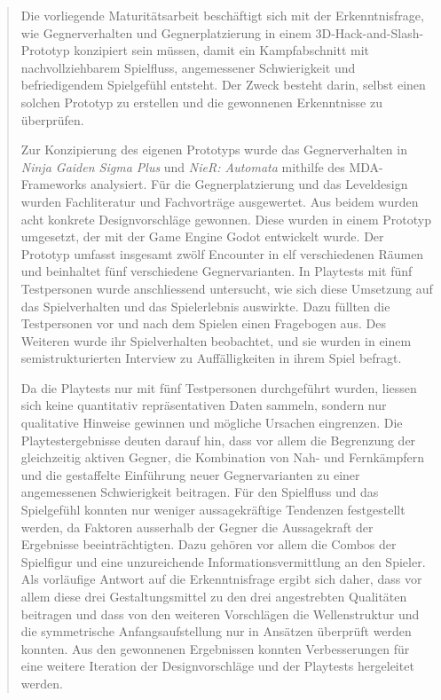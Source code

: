 \documentclass[10pt]{article}
\newcommand{\game}[1]{\textit{#1}}   %
\begin{document}
\begin{abstract}
    Die vorliegende Maturitätsarbeit beschäftigt sich mit der Erkenntnisfrage, wie Gegnerverhalten und Gegnerplatzierung in einem 3D-Hack-and-Slash-Prototyp konzipiert sein müssen, damit ein Kampfabschnitt mit nachvollziehbarem Spielfluss, angemessener Schwierigkeit und befriedigendem Spielgefühl entsteht. Der Zweck besteht darin, selbst einen solchen Prototyp zu erstellen und die gewonnenen Erkenntnisse zu überprüfen.

    Zur Konzipierung des eigenen Prototyps wurde das Gegnerverhalten in \game{Ninja Gaiden Sigma Plus} und \game{NieR: Automata} mithilfe des MDA-Frameworks analysiert. Für die Gegnerplatzierung und das Leveldesign wurden Fachliteratur und Fachvorträge ausgewertet. Aus beidem wurden acht konkrete Designvorschläge gewonnen. Diese wurden in einem Prototyp umgesetzt, der mit der Game Engine Godot entwickelt wurde. Der Prototyp umfasst insgesamt zwölf Encounter in elf verschiedenen Räumen und beinhaltet fünf verschiedene Gegnervarianten. In Playtests mit fünf Testpersonen wurde anschliessend untersucht, wie sich diese Umsetzung auf das Spielverhalten und das Spielerlebnis auswirkte. Dazu füllten die Testpersonen vor und nach dem Spielen einen Fragebogen aus. Des Weiteren wurde ihr Spielverhalten beobachtet, und sie wurden in einem semistrukturierten Interview zu Auffälligkeiten in ihrem Spiel befragt.

    Da die Playtests nur mit fünf Testpersonen durchgeführt wurden, liessen sich keine quantitativ repräsentativen Daten sammeln, sondern nur qualitative Hinweise gewinnen und mögliche Ursachen eingrenzen. Die Playtestergebnisse deuten darauf hin, dass vor allem die Begrenzung der gleichzeitig aktiven Gegner, die Kombination von Nah- und Fernkämpfern und die gestaffelte Einführung neuer Gegnervarianten zu einer angemessenen Schwierigkeit beitragen. Für den Spielfluss und das Spielgefühl konnten nur weniger aussagekräftige Tendenzen festgestellt werden, da Faktoren ausserhalb der Gegner die Aussagekraft der Ergebnisse beeinträchtigten. Dazu gehören vor allem die Combos der Spielfigur und eine unzureichende Informationsvermittlung an den Spieler. Als vorläufige Antwort auf die Erkenntnisfrage ergibt sich daher, dass vor allem diese drei Gestaltungsmittel zu den drei angestrebten Qualitäten beitragen und dass von den weiteren Vorschlägen die Wellenstruktur und die symmetrische Anfangsaufstellung nur in Ansätzen überprüft werden konnten. Aus den gewonnenen Ergebnissen konnten Verbesserungen für eine weitere Iteration der Designvorschläge und der Playtests hergeleitet werden.
\end{abstract}
\end{document}
